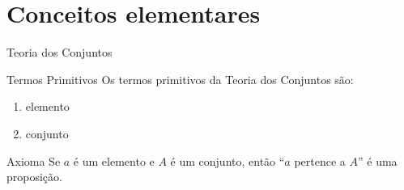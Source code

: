 \section{Conceitos elementares}

\begin{frame}[fragile]{Teoria dos Conjuntos}

    \begin{block}{Termos Primitivos}
        Os termos primitivos da Teoria dos Conjuntos são:
        \begin{enumerate}
            \item elemento
            \item conjunto
        \end{enumerate}
    \end{block}

    \begin{block}{Axioma}
        Se $a$ é um elemento e $A$ é um conjunto, então ``$a$ pertence a $A$'' é uma proposição.
    \end{block}

\end{frame}

